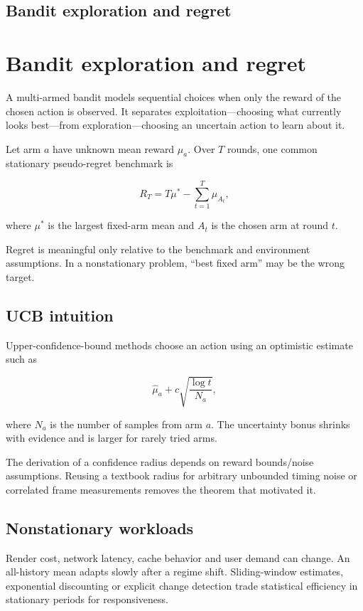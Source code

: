 \hypertarget{appendix-3dc863dbddf3}{}
\section*{Bandit exploration and regret}
\chapter{Bandit exploration and regret}\label{appendix-3dc863dbddf3-bandit-exploration-and-regret}

A multi-armed bandit models sequential choices when only the reward of the chosen action is observed. It separates exploitation---choosing what currently looks best---from exploration---choosing an uncertain action to learn about it.

Let arm \(a\) have unknown mean reward \(\mu_a\). Over \(T\) rounds, one common stationary pseudo-regret benchmark is

\[
R_T=T\mu^*-\sum_{t=1}^{T}\mu_{A_t},
\]

where \(\mu^*\) is the largest fixed-arm mean and \(A_t\) is the chosen arm at round \(t\).

Regret is meaningful only relative to the benchmark and environment assumptions. In a nonstationary problem, ``best fixed arm'' may be the wrong target.

\section{UCB intuition}\label{appendix-3dc863dbddf3-ucb-intuition}

Upper-confidence-bound methods choose an action using an optimistic estimate such as

\[
\hat\mu_a+
c\sqrt{\frac{\log t}{N_a}},
\]

where \(N_a\) is the number of samples from arm \(a\). The uncertainty bonus shrinks with evidence and is larger for rarely tried arms.

The derivation of a confidence radius depends on reward bounds/noise assumptions. Reusing a textbook radius for arbitrary unbounded timing noise or correlated frame measurements removes the theorem that motivated it.

\section{Nonstationary workloads}\label{appendix-3dc863dbddf3-nonstationary-workloads}

Render cost, network latency, cache behavior and user demand can change. An all-history mean adapts slowly after a regime shift. Sliding-window estimates, exponential discounting or explicit change detection trade statistical efficiency in stationary periods for responsiveness.

